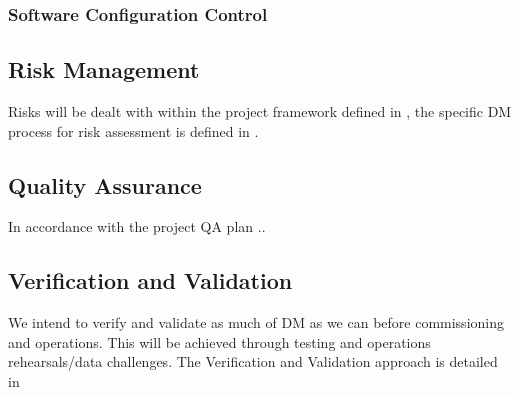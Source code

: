 \subsubsection{Software Configuration Control}

\subsection {Risk Management } \label{sect:risk}

Risks will be dealt with within the project framework defined in , the specific DM process for risk assessment is defined in .


\subsection {Quality Assurance  } \label{sect:pa}
In accordance with the project QA plan  ..

\subsection {Verification and Validation } \label{sect:vanv}
We intend to verify and validate as much of DM as we can before commissioning and operations. This will be achieved through testing and
operations rehearsals/data challenges. The Verification and Validation approach is detailed in \citeyearpar{LDM-503}
